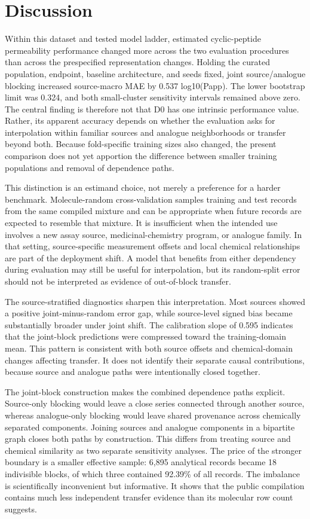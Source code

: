 \documentclass[referee,lineno,pdflatex,Numbered,sn-basic]{sn-jnl}
\begin{document}
\section{Discussion}

Within this dataset and tested model ladder, estimated cyclic-peptide permeability performance changed more across the two evaluation procedures than across the prespecified representation changes. Holding the curated population, endpoint, baseline architecture, and seeds fixed, joint source/analogue blocking increased source-macro MAE by 0.537 log10(Papp). The lower bootstrap limit was 0.324, and both small-cluster sensitivity intervals remained above zero. The central finding is therefore not that D0 has one intrinsic performance value. Rather, its apparent accuracy depends on whether the evaluation asks for interpolation within familiar sources and analogue neighborhoods or transfer beyond both. Because fold-specific training sizes also changed, the present comparison does not yet apportion the difference between smaller training populations and removal of dependence paths.

This distinction is an estimand choice, not merely a preference for a harder benchmark. Molecule-random cross-validation samples training and test records from the same compiled mixture and can be appropriate when future records are expected to resemble that mixture. It is insufficient when the intended use involves a new assay source, medicinal-chemistry program, or analogue family. In that setting, source-specific measurement offsets and local chemical relationships are part of the deployment shift. A model that benefits from either dependency during evaluation may still be useful for interpolation, but its random-split error should not be interpreted as evidence of out-of-block transfer.

The source-stratified diagnostics sharpen this interpretation. Most sources showed a positive joint-minus-random error gap, while source-level signed bias became substantially broader under joint shift. The calibration slope of 0.595 indicates that the joint-block predictions were compressed toward the training-domain mean. This pattern is consistent with both source offsets and chemical-domain changes affecting transfer. It does not identify their separate causal contributions, because source and analogue paths were intentionally closed together.

The joint-block construction makes the combined dependence paths explicit. Source-only blocking would leave a close series connected through another source, whereas analogue-only blocking would leave shared provenance across chemically separated components. Joining sources and analogue components in a bipartite graph closes both paths by construction. This differs from treating source and chemical similarity as two separate sensitivity analyses. The price of the stronger boundary is a smaller effective sample: 6,895 analytical records became 18 indivisible blocks, of which three contained 92.39\% of all records. The imbalance is scientifically inconvenient but informative. It shows that the public compilation contains much less independent transfer evidence than its molecular row count suggests.
\end{document}

